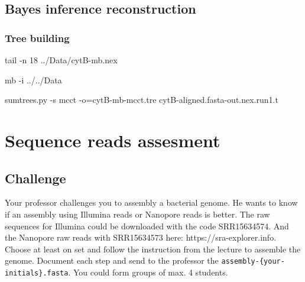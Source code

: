 \documentclass[
  letterpaper,
]{scrbook}
\newenvironment{Shaded}{\begin{snugshade}}{\end{snugshade}}
\newcommand{\AttributeTok}[1]{\textcolor[rgb]{0.40,0.46,0.14}{#1}}
\newcommand{\ExtensionTok}[1]{\textcolor[rgb]{0.00,0.46,0.62}{#1}}
\newcommand{\FunctionTok}[1]{\textcolor[rgb]{0.28,0.35,0.67}{#1}}
\newcommand{\NormalTok}[1]{\textcolor[rgb]{0.00,0.46,0.62}{#1}}
\newcommand{\OperatorTok}[1]{\textcolor[rgb]{0.37,0.37,0.37}{#1}}
\begin{document}
\hypertarget{bayes-inference-reconstruction}{%
\section*{Bayes inference
reconstruction}\label{bayes-inference-reconstruction}}

\hypertarget{tree-building-1}{%
\subsection*{Tree building}\label{tree-building-1}}

\begin{Shaded}
\begin{Highlighting}[]
\FunctionTok{tail} \AttributeTok{{-}n}\NormalTok{ 18 ../Data/cytB{-}mb.nex}
\end{Highlighting}
\end{Shaded}

\begin{Shaded}
\begin{Highlighting}[]
\ExtensionTok{mb} \AttributeTok{{-}i}\NormalTok{ ../../Data}
\end{Highlighting}
\end{Shaded}

\begin{Shaded}
\begin{Highlighting}[]
\ExtensionTok{sumtrees.py} \AttributeTok{{-}s}\NormalTok{ mcct }\AttributeTok{{-}o}\OperatorTok{=}\NormalTok{cytB{-}mb{-}mcct.tre cytB{-}aligned.fasta{-}out.nex.run1.t}
\end{Highlighting}
\end{Shaded}

\hypertarget{sequence-reads-assesment}{%
\chapter{Sequence reads assesment}\label{sequence-reads-assesment}}

\hypertarget{challenge-4}{%
\section*{Challenge}\label{challenge-4}}

Your professor challenges you to assembly a bacterial genome. He wants
to know if an assembly using Illumina reads or Nanopore reads is better.
The raw sequences for Illumina could be downloaded with the code
SRR15634574. And the Nanopore raw reads with SRR15634573 here:
https://sra-explorer.info. Choose at least on set and follow the
instruction from the lecture to assemble the genome. Document each step
and send to the professor the \texttt{assembly-\{your-initials\}.fasta}.
You could form groups of max. 4 students.
\end{document}

